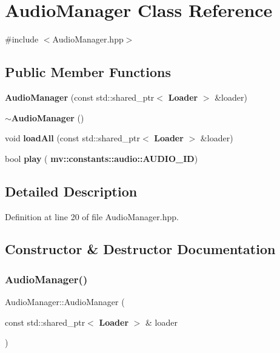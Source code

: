 \section{Audio\+Manager Class Reference}
\label{class_audio_manager}


{\ttfamily \#include $<$Audio\+Manager.\+hpp$>$}

\subsection*{Public Member Functions}
\begin{DoxyCompactItemize}
\item 
\textbf{ Audio\+Manager} (const std\+::shared\+\_\+ptr$<$ \textbf{ Loader} $>$ \&loader)
\item 
\textbf{ $\sim$\+Audio\+Manager} ()
\item 
void \textbf{ load\+All} (const std\+::shared\+\_\+ptr$<$ \textbf{ Loader} $>$ \&loader)
\item 
bool \textbf{ play} (\textbf{ mv\+::constants\+::audio\+::\+A\+U\+D\+I\+O\+\_\+\+ID})
\end{DoxyCompactItemize}


\subsection{Detailed Description}


Definition at line 20 of file Audio\+Manager.\+hpp.



\subsection{Constructor \& Destructor Documentation}
\mbox{\label{class_audio_manager_a9ca44bfdbf711a97ce8563a5dd3d731a}} 
\subsubsection{Audio\+Manager()}
{\footnotesize\ttfamily Audio\+Manager\+::\+Audio\+Manager (\begin{DoxyParamCaption}\item[{const std\+::shared\+\_\+ptr$<$ \textbf{ Loader} $>$ \&}]{loader }\end{DoxyParamCaption})}



